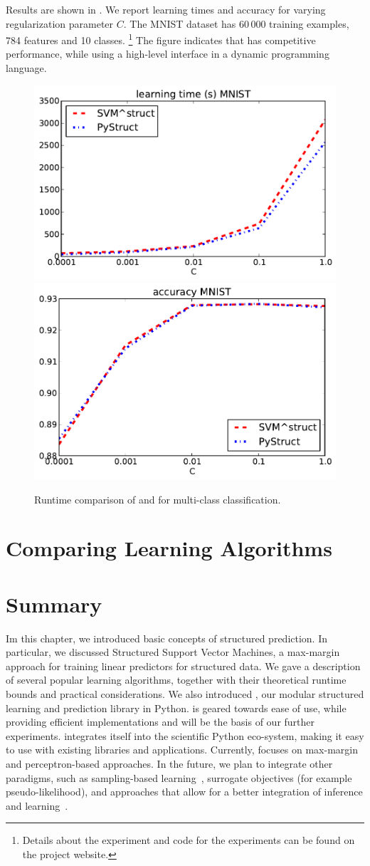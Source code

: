 Results are shown in . We report learning times and accuracy for
varying regularization parameter $C$. The MNIST dataset has 60\,000 training
examples, 784 features and 10 classes.%
\footnote{Details about the experiment and code for the experiments can be found on the project website.}
The figure indicates that \pystruct has competitive performance, while using
a high-level interface in a dynamic programming language.

\begin{figure}
\centering
\includegraphics[width=.49\textwidth]{times_MNIST}
\includegraphics[width=.49\textwidth]{accs_MNIST}
\caption{Runtime comparison of \pystruct and \svmstruct for multi-class
    classification.
}
\label{fig:timings}
\end{figure}

\section{Comparing Learning Algorithms}

\section{Summary}
Im this chapter, we introduced basic concepts of structured prediction. In particular, we discussed
Structured Support Vector Machines, a max-margin approach for training linear predictors for
structured data. %
We gave a description of several popular learning algorithms, together with their theoretical
runtime bounds and practical considerations.
We also introduced \pystruct, our modular structured learning and prediction library in Python.
\pystruct is geared towards ease of use, while providing efficient implementations and will be the
basis of our further experiments.
\pystruct integrates itself into the scientific Python eco-system, making it easy to use with
existing libraries and applications.
Currently, \pystruct focuses on max-margin and perceptron-based approaches.
In the future, we plan to integrate other paradigms, such as sampling-based
learning~\citep{wick2011samplerank}, surrogate objectives (for example
pseudo-likelihood), and approaches that allow for a better integration of
inference and learning~\citep{meshi2010learning}.
